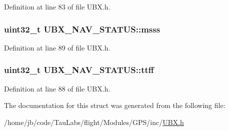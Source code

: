 \-Definition at line 83 of file \-U\-B\-X.\-h.

\hypertarget{struct_u_b_x___n_a_v___s_t_a_t_u_s_a41de8d3154dd215b93adeebff5a7972c}{
\subsubsection[{msss}]{\setlength{\rightskip}{0pt plus 5cm}uint32\-\_\-t {\bf \-U\-B\-X\-\_\-\-N\-A\-V\-\_\-\-S\-T\-A\-T\-U\-S\-::msss}}}\label{struct_u_b_x___n_a_v___s_t_a_t_u_s_a41de8d3154dd215b93adeebff5a7972c}


\-Definition at line 89 of file \-U\-B\-X.\-h.

\hypertarget{struct_u_b_x___n_a_v___s_t_a_t_u_s_a9810462abcdcce5e305e41d4d6526699}{
\subsubsection[{ttff}]{\setlength{\rightskip}{0pt plus 5cm}uint32\-\_\-t {\bf \-U\-B\-X\-\_\-\-N\-A\-V\-\_\-\-S\-T\-A\-T\-U\-S\-::ttff}}}\label{struct_u_b_x___n_a_v___s_t_a_t_u_s_a9810462abcdcce5e305e41d4d6526699}


\-Definition at line 88 of file \-U\-B\-X.\-h.



\-The documentation for this struct was generated from the following file\-:\begin{DoxyCompactItemize}
\item 
/home/jb/code/\-Tau\-Labs/flight/\-Modules/\-G\-P\-S/inc/\hyperlink{_u_b_x_8h}{\-U\-B\-X.\-h}\end{DoxyCompactItemize}
